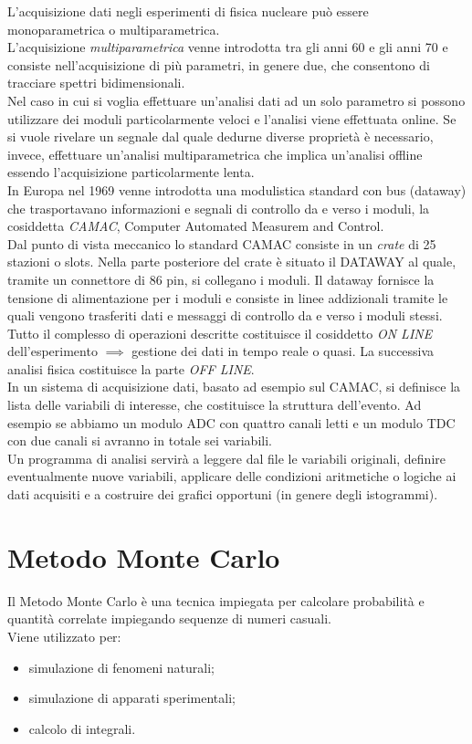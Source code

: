 \documentclass[12pt, letterpaper]{book}
\begin{document}
L'acquisizione dati negli esperimenti di fisica nucleare può essere monoparametrica o multiparametrica.\\
L'acquisizione \textit{multiparametrica} venne introdotta tra gli anni 60 e gli anni 70 e consiste nell'acquisizione di più parametri, in genere due, che consentono di tracciare spettri
bidimensionali.\\
Nel caso in cui si voglia effettuare un'analisi dati ad un solo parametro si possono utilizzare dei moduli particolarmente veloci e l'analisi viene effettuata online. Se si vuole rivelare un segnale dal quale dedurne diverse proprietà è necessario, invece, effettuare un'analisi multiparametrica che implica un'analisi offline essendo l'acquisizione particolarmente lenta.\\
In Europa nel 1969 venne introdotta una modulistica standard con bus (dataway) che trasportavano informazioni e segnali di controllo da e verso i moduli, la cosiddetta \textit{CAMAC}, Computer Automated Measurem and Control.\\
Dal punto di vista meccanico lo standard CAMAC consiste in un \textit{crate} di 25 stazioni o slots. Nella parte posteriore del crate è situato il DATAWAY al quale, tramite un connettore di 86 pin, si collegano i moduli. Il dataway fornisce la tensione di alimentazione per i moduli e consiste in linee addizionali tramite le quali vengono trasferiti dati e messaggi di controllo da e verso i moduli stessi.\\
Tutto il complesso di operazioni descritte costituisce il cosiddetto \textit{ON LINE} dell’esperimento $\implies$ gestione dei dati in tempo reale o quasi. La successiva analisi fisica costituisce la parte \textit{OFF LINE}.\\
In un sistema di acquisizione dati, basato ad esempio sul CAMAC, si definisce la lista delle variabili di interesse, che costituisce la struttura dell'evento. Ad esempio se abbiamo un modulo ADC con quattro canali letti e un modulo TDC con due canali si avranno in totale sei variabili.\\
Un programma di analisi servirà a leggere dal file le variabili originali, definire eventualmente nuove variabili, applicare delle condizioni aritmetiche o logiche ai dati acquisiti e a costruire dei
grafici opportuni (in genere degli istogrammi).

\chapter{Metodo Monte Carlo}
Il Metodo Monte Carlo  è una tecnica impiegata per calcolare probabilità e quantità correlate impiegando sequenze di numeri casuali.\\
Viene utilizzato per:
\begin{itemize}
    \item simulazione di fenomeni naturali;
    \item simulazione di apparati sperimentali;
    \item calcolo di integrali.
\end{itemize}
\end{document}
